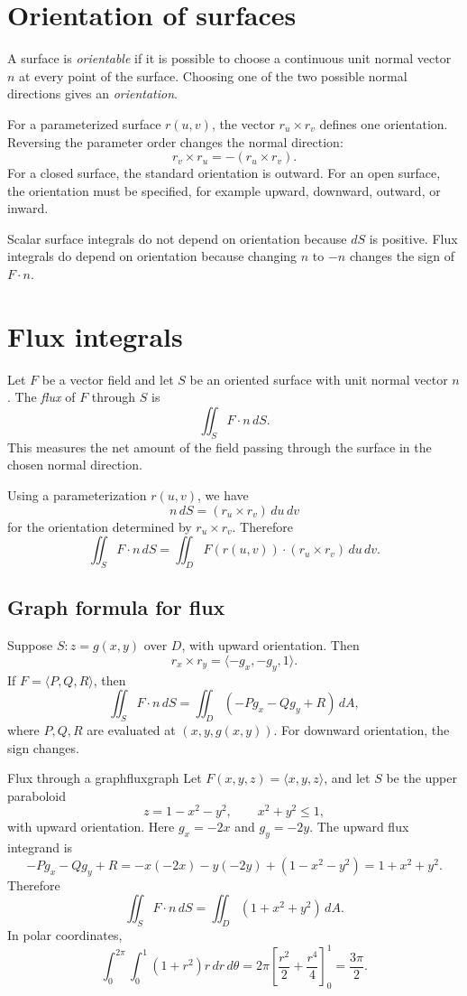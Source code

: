 \documentclass[11pt]{article}
\newcommand{\dS}{\,dS}
\newcommand{\dA}{\,dA}
\newcommand{\du}{\,du}
\newcommand{\dv}{\,dv}
\begin{document}
\section{Orientation of surfaces}

A surface is \emph{orientable} if it is possible to choose a continuous unit normal vector $n$ at every point of the surface. Choosing one of the two possible normal directions gives an \emph{orientation}.

For a parameterized surface $r(u,v)$, the vector $r_u\times r_v$ defines one orientation. Reversing the parameter order changes the normal direction:
\[
r_v\times r_u=-(r_u\times r_v).
\]
For a closed surface, the standard orientation is outward. For an open surface, the orientation must be specified, for example upward, downward, outward, or inward.

\begin{warningbox}
Scalar surface integrals do not depend on orientation because $dS$ is positive. Flux integrals do depend on orientation because changing $n$ to $-n$ changes the sign of $F\cdot n$.
\end{warningbox}

\section{Flux integrals}

Let $F$ be a vector field and let $S$ be an oriented surface with unit normal vector $n$. The \emph{flux} of $F$ through $S$ is
\[
\iint_S F\cdot n\dS.
\]
This measures the net amount of the field passing through the surface in the chosen normal direction.

Using a parameterization $r(u,v)$, we have
\[
n\dS=(r_u\times r_v)\du\dv
\]
for the orientation determined by $r_u\times r_v$. Therefore
\[
\iint_S F\cdot n\dS=\iint_D F(r(u,v))\cdot(r_u\times r_v)\du\dv.
\]

\subsection*{Graph formula for flux}
Suppose $S:z=g(x,y)$ over $D$, with upward orientation. Then
\[
r_x\times r_y=\langle -g_x,-g_y,1\rangle.
\]
If $F=\langle P,Q,R\rangle$, then
\[
\iint_S F\cdot n\dS=\iint_D (-Pg_x-Qg_y+R)\dA,
\]
where $P,Q,R$ are evaluated at $(x,y,g(x,y))$. For downward orientation, the sign changes.

\begin{examplebox}{Flux through a graph}{fluxgraph}
Let $F(x,y,z)=\langle x,y,z\rangle$, and let $S$ be the upper paraboloid
\[
z=1-x^2-y^2,\qquad x^2+y^2\le 1,
\]
with upward orientation. Here $g_x=-2x$ and $g_y=-2y$. The upward flux integrand is
\[
-Pg_x-Qg_y+R=-x(-2x)-y(-2y)+(1-x^2-y^2)=1+x^2+y^2.
\]
Therefore
\[
\iint_S F\cdot n\dS=\iint_D (1+x^2+y^2)\dA.
\]
In polar coordinates,
\[
\int_0^{2\pi}\int_0^1 (1+r^2)r\,dr\,d\theta
=2\pi\left[\frac{r^2}{2}+\frac{r^4}{4}\right]_0^1
=\frac{3\pi}{2}.
\]
\end{examplebox}
\end{document}
